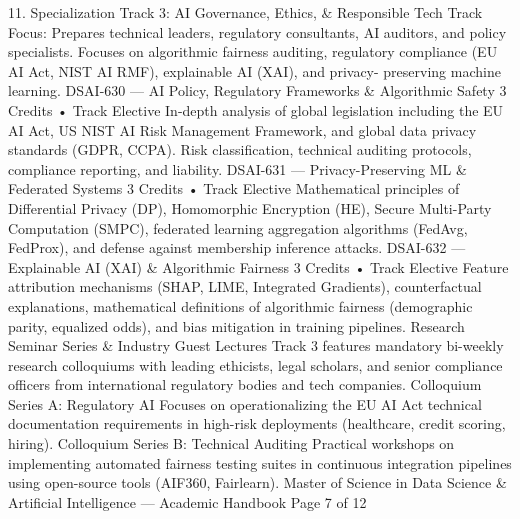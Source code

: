 \documentclass[12pt]{article}
\begin{document}
11. Specialization Track 3: AI Governance, Ethics, \& Responsible Tech
Track Focus: Prepares technical leaders, regulatory consultants, AI auditors, and policy specialists. Focuses on
algorithmic fairness auditing, regulatory compliance (EU AI Act, NIST AI RMF), explainable AI (XAI), and privacy-
preserving machine learning.
DSAI-630 — AI Policy, Regulatory Frameworks \& Algorithmic Safety
3 Credits • Track Elective
In-depth analysis of global legislation including the EU AI Act, US NIST AI Risk Management Framework, and
global data privacy standards (GDPR, CCPA). Risk classification, technical auditing protocols, compliance
reporting, and liability.
DSAI-631 — Privacy-Preserving ML \& Federated Systems
3 Credits • Track Elective
Mathematical principles of Differential Privacy (DP), Homomorphic Encryption (HE), Secure Multi-Party
Computation (SMPC), federated learning aggregation algorithms (FedAvg, FedProx), and defense against
membership inference attacks.
DSAI-632 — Explainable AI (XAI) \& Algorithmic Fairness
3 Credits • Track Elective
Feature attribution mechanisms (SHAP, LIME, Integrated Gradients), counterfactual explanations, mathematical
definitions of algorithmic fairness (demographic parity, equalized odds), and bias mitigation in training pipelines.
Research Seminar Series \& Industry Guest Lectures
Track 3 features mandatory bi-weekly research colloquiums with leading ethicists, legal scholars, and senior
compliance officers from international regulatory bodies and tech companies.
Colloquium Series A: Regulatory AI
Focuses on operationalizing the EU AI Act technical
documentation requirements in high-risk deployments
(healthcare, credit scoring, hiring).
Colloquium Series B: Technical Auditing
Practical workshops on implementing automated fairness
testing suites in continuous integration pipelines using
open-source tools (AIF360, Fairlearn).
Master of Science in Data Science \& Artificial Intelligence — Academic Handbook
Page 7 of 12
\end{document}
